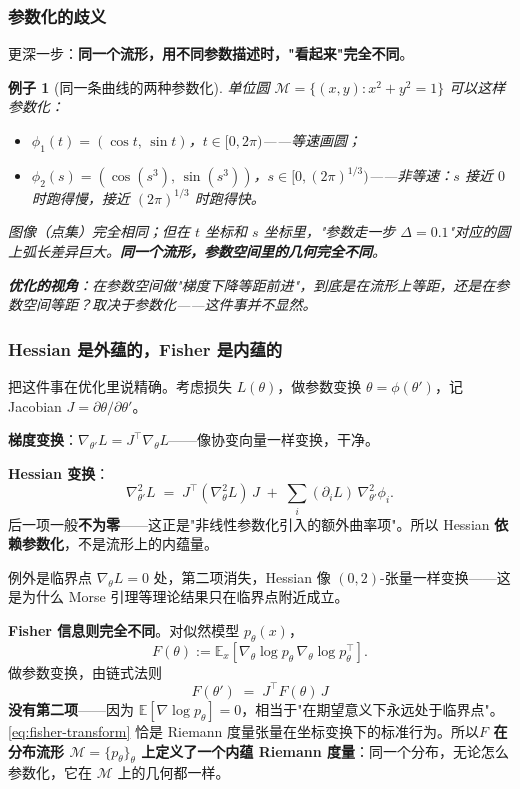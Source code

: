 \documentclass[11pt,a4paper]{article}
\theoremstyle{mythm}
\theoremstyle{mydef}
\newtheorem{example}[theorem]{例子}
\newcommand{\E}{\mathbb{E}}
\begin{document}
\subsubsection*{参数化的歧义}

更深一步：\textbf{同一个流形，用不同参数描述时，"看起来"完全不同}。

\begin{example}[同一条曲线的两种参数化]\label{ex:circle-param}
单位圆 $\mathcal{M} = \{(x,y): x^2+y^2 = 1\}$ 可以这样参数化：
\begin{itemize}[leftmargin=2em]
\item $\phi_1(t) = (\cos t,\, \sin t)$，$t \in [0, 2\pi)$——\emph{等速}画圆；
\item $\phi_2(s) = (\cos(s^3),\, \sin(s^3))$，$s \in [0, (2\pi)^{1/3})$——\emph{非等速}：$s$ 接近 $0$ 时跑得慢，接近 $(2\pi)^{1/3}$ 时跑得快。
\end{itemize}
图像（点集）完全相同；但在 $t$ 坐标和 $s$ 坐标里，"参数走一步 $\Delta = 0.1$"对应的圆上弧长差异巨大。\textbf{同一个流形，参数空间里的几何完全不同}。

\textbf{优化的视角}：在参数空间做"梯度下降等距前进"，到底是在流形上等距，还是在参数空间等距？取决于参数化——这件事并不显然。
\end{example}

\subsubsection*{Hessian 是外蕴的，Fisher 是内蕴的}

把这件事在优化里说精确。考虑损失 $L(\theta)$，做参数变换 $\theta = \phi(\theta')$，记 Jacobian $J = \partial\theta/\partial\theta'$。

\textbf{梯度变换}：$\nabla_{\theta'} L = J^\top \nabla_\theta L$——像协变向量一样变换，干净。

\textbf{Hessian 变换}：
\begin{equation}\label{eq:hess-transform}
\nabla^2_{\theta'} L \;=\; J^\top (\nabla^2_\theta L)\, J \;+\; \sum_i (\partial_i L)\,\nabla^2_{\theta'}\phi_i.
\end{equation}
后一项一般\textbf{不为零}——这正是"非线性参数化引入的额外曲率项"。所以 Hessian \textbf{依赖参数化}，不是流形上的内蕴量。

例外是临界点 $\nabla_\theta L = 0$ 处，第二项消失，Hessian 像 $(0,2)$-张量一样变换——这是为什么 Morse 引理等理论结果只在临界点附近成立。

\textbf{Fisher 信息则完全不同}。对似然模型 $p_\theta(x)$，
$$F(\theta) := \E_x\!\left[\nabla_\theta \log p_\theta\,\nabla_\theta \log p_\theta^\top\right].$$
做参数变换，由链式法则
\begin{equation}\label{eq:fisher-transform}
F(\theta') \;=\; J^\top F(\theta)\, J
\end{equation}
\textbf{没有第二项}——因为 $\E[\nabla\log p_\theta] = 0$，相当于"在期望意义下永远处于临界点"。\eqref{eq:fisher-transform} 恰是 Riemann 度量张量在坐标变换下的标准行为。所以\textbf{$F$ 在分布流形 $\mathcal{M} = \{p_\theta\}_\theta$ 上定义了一个内蕴 Riemann 度量}：同一个分布，无论怎么参数化，它在 $\mathcal{M}$ 上的几何都一样。
\end{document}
